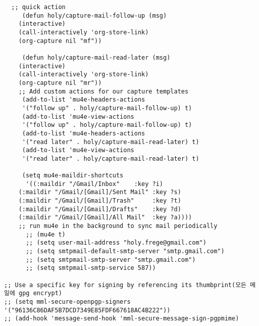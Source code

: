 \documentclass[11pt]{article}
\begin{document}
\begin{verbatim}
  ;; quick action
     (defun holy/capture-mail-follow-up (msg)
	(interactive)
	(call-interactively 'org-store-link)
	(org-capture nil "mf"))

     (defun holy/capture-mail-read-later (msg)
	(interactive)
	(call-interactively 'org-store-link)
	(org-capture nil "mr"))
	;; Add custom actions for our capture templates
     (add-to-list 'mu4e-headers-actions
	 '("follow up" . holy/capture-mail-follow-up) t)
     (add-to-list 'mu4e-view-actions
	 '("follow up" . holy/capture-mail-follow-up) t)
     (add-to-list 'mu4e-headers-actions
	 '("read later" . holy/capture-mail-read-later) t)
     (add-to-list 'mu4e-view-actions
	 '("read later" . holy/capture-mail-read-later) t)

     (setq mu4e-maildir-shortcuts
      '((:maildir "/Gmail/Inbox"    :key ?i)
	(:maildir "/Gmail/[Gmail]/Sent Mail" :key ?s)
	(:maildir "/Gmail/[Gmail]/Trash"     :key ?t)
	(:maildir "/Gmail/[Gmail]/Drafts"    :key ?d)
	(:maildir "/Gmail/[Gmail]/All Mail"  :key ?a))))
	;; run mu4e in the background to sync mail periodically
      ;; (mu4e t)  
      ;; (setq user-mail-address "holy.frege@gmail.com")
      ;; (setq smtpmail-default-smtp-server "smtp.gmail.com")
      ;; (setq smtpmail-smtp-server "smtp.gmail.com")
      ;; (setq smtpmail-smtp-service 587))

;; Use a specific key for signing by referencing its thumbprint(모든 메일에 gpg encrypt)
;; (setq mml-secure-openpgp-signers '("96136C86DAF5B7DCD7349E85FDF667618AC4B222"))
;; (add-hook 'message-send-hook 'mml-secure-message-sign-pgpmime)
\end{verbatim}
\end{document}
